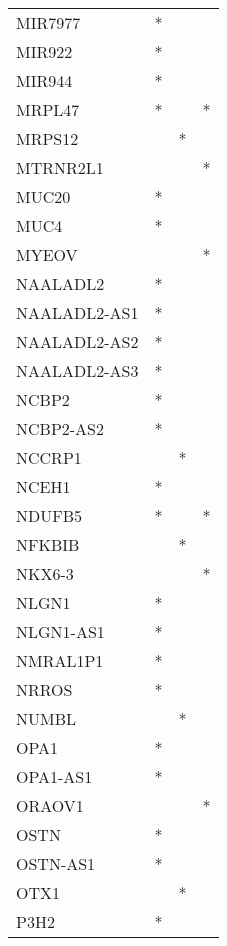 \begin{longtable}{lccc}
MIR7977          &     * &    &         \\
MIR922           &     * &    &         \\
MIR944           &     * &    &         \\
MRPL47           &     * &    &       * \\
MRPS12           &       &  * &         \\
MTRNR2L1         &       &    &       * \\
MUC20            &     * &    &         \\
MUC4             &     * &    &         \\
MYEOV            &       &    &       * \\
NAALADL2         &     * &    &         \\
NAALADL2-AS1     &     * &    &         \\
NAALADL2-AS2     &     * &    &         \\
NAALADL2-AS3     &     * &    &         \\
NCBP2            &     * &    &         \\
NCBP2-AS2        &     * &    &         \\
NCCRP1           &       &  * &         \\
NCEH1            &     * &    &         \\
NDUFB5           &     * &    &       * \\
NFKBIB           &       &  * &         \\
NKX6-3           &       &    &       * \\
NLGN1            &     * &    &         \\
NLGN1-AS1        &     * &    &         \\
NMRAL1P1         &     * &    &         \\
NRROS            &     * &    &         \\
NUMBL            &       &  * &         \\
OPA1             &     * &    &         \\
OPA1-AS1         &     * &    &         \\
ORAOV1           &       &    &       * \\
OSTN             &     * &    &         \\
OSTN-AS1         &     * &    &         \\
OTX1             &       &  * &         \\
P3H2             &     * &    &         \\

\end{longtable}
